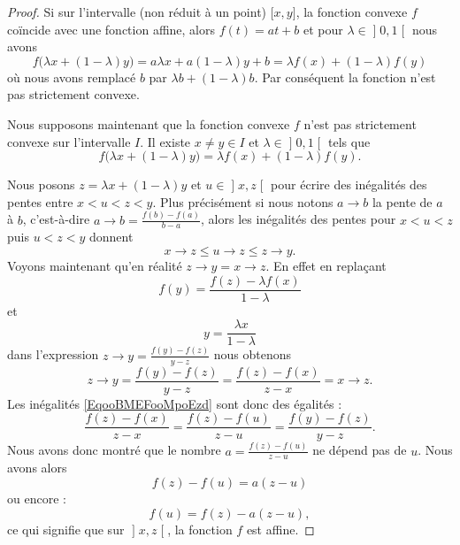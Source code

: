 \begin{proof}
	Si sur l'intervalle (non réduit à un point) \( \mathopen[ x , y \mathclose]\), la fonction convexe \( f\) coïncide avec une fonction affine, alors \( f(t)=at+b\) et pour \( \lambda\in\mathopen] 0 , 1 \mathclose[\) nous avons
		\begin{equation}
			f\big( \lambda x+(1-\lambda)y \big)=a\lambda x+a(1-\lambda)y+b=\lambda f(x)+(1-\lambda)f(y)
		\end{equation}
		où nous avons remplacé \( b\) par \( \lambda b+(1-\lambda)b\). Par conséquent la fonction n'est pas strictement convexe.

		Nous supposons maintenant que la fonction convexe \( f\) n'est pas strictement convexe sur l'intervalle \( I\). Il existe \( x\neq y\in I\) et \( \lambda\in \mathopen] 0 , 1 \mathclose[\) tels que
		\begin{equation}
			f\big( \lambda x+(1-\lambda)y \big)=\lambda f(x)+(1-\lambda)f(y).
		\end{equation}

		Nous posons \( z=\lambda x+(1-\lambda)y\) et \( u\in\mathopen] x , z \mathclose[\) pour écrire des inégalités des pentes entre \( x<u<z<y\). Plus précisément si nous notons \( a\to b\) la pente de \( a\) à \( b\), c'est-à-dire \( a\to b=\frac{ f(b)-f(a) }{ b-a }\), alors les inégalités des pentes pour \( x<u<z\) puis \( u<z<y\) donnent
		\begin{equation}        \label{EqooBMEFooMpoEzd}
			x\to z\leq u\to z\leq z\to y.
		\end{equation}
		Voyons maintenant qu'en réalité \( z\to y=x\to z\). En effet en replaçant
		\begin{equation}
			f(y)=\frac{ f(z)-\lambda f(x) }{ 1-\lambda }
		\end{equation}
		et
		\begin{equation}
			y=\frac{ \lambda x }{ 1-\lambda }
		\end{equation}
		dans l'expression \( z\to y=\frac{ f(y)-f(z) }{ y-z }\) nous obtenons
		\begin{equation}
			z\to y=\frac{ f(y)-f(z) }{ y-z }=\frac{ f(z)-f(x) }{ z-x }=x\to z.
		\end{equation}
		Les inégalités \eqref{EqooBMEFooMpoEzd} sont donc des égalités :
		\begin{equation}
			\frac{ f(z)-f(x) }{ z-x }=\frac{ f(z)-f(u) }{ z-u }=\frac{ f(y)-f(z) }{ y-z }.
		\end{equation}
		Nous avons donc montré que le nombre \( a=\frac{ f(z)-f(u) }{ z-u }\) ne dépend pas de \( u\). Nous avons alors
		\begin{equation}
			f(z)-f(u)=a(z-u)
		\end{equation}
		ou encore :
		\begin{equation}
			f(u)=f(z)-a(z-u),
		\end{equation}
		ce qui signifie que sur \( \mathopen] x , z \mathclose[\), la fonction \( f\) est affine.
\end{proof}

